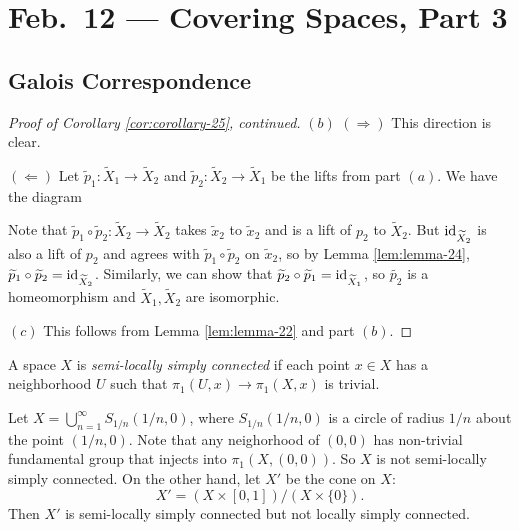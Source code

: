 \chapter{Feb.~12 --- Covering Spaces, Part 3}

\section{Galois Correspondence}
\begin{proof}[Proof of Corollary \ref{cor:corollary-25}, continued]
  $(b)$ $(\Rightarrow)$ This direction is clear.

  $(\Leftarrow)$ Let $\widetilde{p}_1 : \widetilde{X}_1 \to \widetilde{X}_2$
  and $\widetilde{p}_2 : \widetilde{X}_2 \to \widetilde{X}_1$
  be the lifts from part $(a)$. We have the diagram
  \begin{center}
  \end{center}
  Note that $\widetilde{p}_1 \circ \widetilde{p}_2 : \widetilde{X}_2 \to \widetilde{X}_2$
  takes $\widetilde{x}_2$ to $\widetilde{x}_2$ and is a
  lift of $p_2$ to $\widetilde{X}_2$. But $\operatorname{id}_{\widetilde{X}_2}$
  is also a lift of $p_2$ and agrees with $\widetilde{p}_1 \circ \widetilde{p}_2$ on $\widetilde{x}_2$,
  so by Lemma \ref{lem:lemma-24}, $\widetilde{p}_1 \circ \widetilde{p}_2 = \operatorname{id}_{\widetilde{X}_2}$.
  Similarly, we can show that $\widetilde{p}_2 \circ \widetilde{p}_1 = \operatorname{id}_{\widetilde{X}_1}$,
  so $\widetilde{p_2}$ is a homeomorphism and
  $\widetilde{X}_1, \widetilde{X}_2$ are isomorphic.

  $(c)$ This follows from Lemma \ref{lem:lemma-22}
  and part $(b)$.
\end{proof}

\begin{definition}
  A space $X$ is \emph{semi-locally simply connected} if
  each point $x \in X$ has a neighborhood $U$ such that
  $\pi_1(U, x) \to \pi_1(X, x)$ is trivial.
\end{definition}

\begin{example}
  Let $X = \bigcup_{n = 1}^\infty S_{1 / n}(1 / n, 0)$,
  where $S_{1 / n}(1 / n, 0)$ is a circle of radius $1 / n$
  about the point $(1 / n, 0)$. Note that any
  neighorhood of $(0, 0)$ has non-trivial fundamental group
  that injects into $\pi_1(X, (0, 0))$.
  So $X$ is not semi-locally simply connected. On the other
  hand,
  let $X'$ be the cone on $X$:
  \[
    X' = (X \times [0, 1]) / (X \times \{0\}).
  \]
  Then $X'$ is semi-locally simply connected but not
  locally simply connected.
\end{example}

